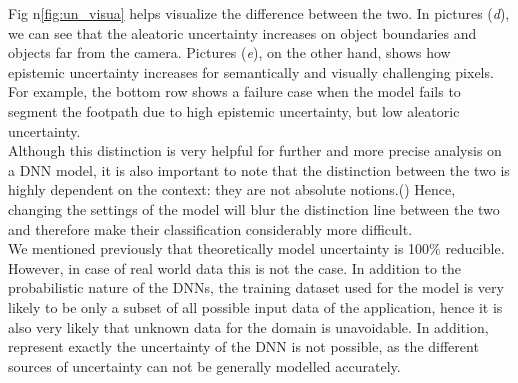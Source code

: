Fig n\ref{fig:un_visua} helps visualize the difference between the two. In pictures (\textit{d}), we can see that the aleatoric uncertainty increases on object boundaries and objects far from the camera. Pictures (\textit{e}), on the other hand, shows how epistemic uncertainty increases for semantically and visually challenging pixels. For example, the bottom row shows a failure case when the model fails to segment the footpath due to high epistemic uncertainty, but low aleatoric uncertainty. \cite{DBLP:journals/corr/KendallG17}\\
Although this distinction is very helpful for further and more precise analysis on a DNN model, it is also important to note that the distinction between the two is highly dependent on the context: they are not absolute notions.(\cite{KIUREGHIAN2009105}) Hence, changing the settings of the model will blur the distinction line between the two and therefore make their classification considerably more difficult.\cite{Separation_uncer}\\
We mentioned previously that theoretically model uncertainty is 100\% reducible. However, in case of real world data this is not the case. In addition to the probabilistic nature of the DNNs, the training dataset used for the model is very likely to be only a subset of all possible input data of the application, hence it is also very likely that unknown data for the domain is unavoidable. In addition, represent exactly the uncertainty of the DNN is not possible, as the different sources of uncertainty can not be generally modelled accurately. \cite{gawlikowski2021survey}\\





